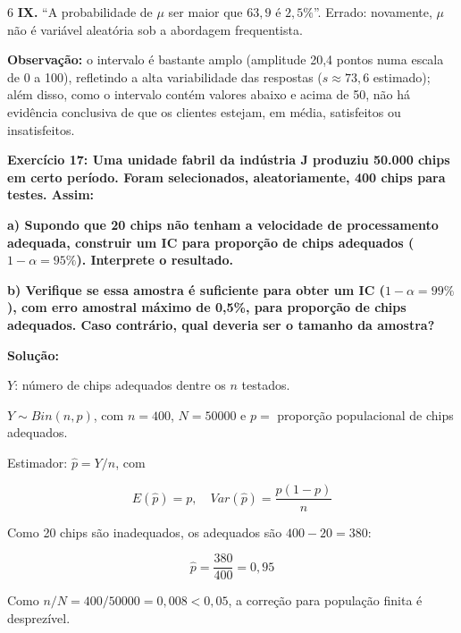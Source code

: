 \documentclass[8pt, a4paper, landscape]{extarticle}
\begin{document}
\begin{multicols}{6}
\textbf{IX.} ``A probabilidade de $\mu$ ser maior que $63,9$ é $2,5\%$''. \newline
Errado: novamente, $\mu$ não é variável aleatória sob a abordagem frequentista.

\vspace{0.2cm}

\textbf{Observação:} o intervalo é bastante amplo (amplitude 20,4 pontos numa escala de 0 a 100), refletindo a alta variabilidade das respostas ($s \approx 73,6$ estimado); além disso, como o intervalo contém valores abaixo e acima de 50, não há evidência conclusiva de que os clientes estejam, em média, satisfeitos ou insatisfeitos.

\textbf{Exercício 17: Uma unidade fabril da indústria J produziu 50.000 chips em certo período. Foram selecionados, aleatoriamente, 400 chips para testes. Assim:}

\textbf{a) Supondo que 20 chips não tenham a velocidade de processamento adequada, construir um IC para proporção de chips adequados ($1-\alpha = 95\%$). Interprete o resultado.}

\textbf{b) Verifique se essa amostra é suficiente para obter um IC ($1-\alpha = 99\%$), com erro amostral máximo de 0,5\%, para proporção de chips adequados. Caso contrário, qual deveria ser o tamanho da amostra?}

\vspace{0.3cm}

\textbf{Solução:}

$Y$: número de chips adequados dentre os $n$ testados.

$Y \sim Bin(n, p)$, com $n = 400$, $N = 50000$ e $p =$ proporção populacional de chips adequados.

Estimador: $\hat{p} = Y/n$, com

\begin{equation*}
E(\hat{p}) = p, \quad Var(\hat{p}) = \frac{p(1-p)}{n}
\end{equation*}

Como 20 chips são inadequados, os adequados são $400 - 20 = 380$:

\begin{equation*}
\hat{p} = \frac{380}{400} = 0,95
\end{equation*}

Como $n/N = 400/50000 = 0,008 < 0,05$, a correção para população finita é desprezível.


\end{multicols}
\end{document}
